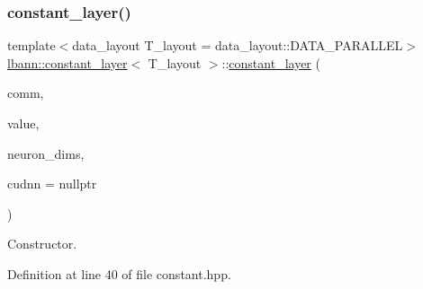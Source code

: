 \subsubsection{\texorpdfstring{constant\+\_\+layer()}{constant\_layer()}}
{\footnotesize\ttfamily template$<$data\+\_\+layout T\+\_\+layout = data\+\_\+layout\+::\+D\+A\+T\+A\+\_\+\+P\+A\+R\+A\+L\+L\+EL$>$ \\
\hyperlink{classlbann_1_1constant__layer}{lbann\+::constant\+\_\+layer}$<$ T\+\_\+layout $>$\+::\hyperlink{classlbann_1_1constant__layer}{constant\+\_\+layer} (\begin{DoxyParamCaption}\item[{\hyperlink{classlbann_1_1lbann__comm}{lbann\+\_\+comm} $\ast$}]{comm,  }\item[{Data\+Type}]{value,  }\item[{const std\+::vector$<$ int $>$ \&}]{neuron\+\_\+dims,  }\item[{\hyperlink{classlbann_1_1cudnn_1_1cudnn__manager}{cudnn\+::cudnn\+\_\+manager} $\ast$}]{cudnn = {\ttfamily nullptr} }\end{DoxyParamCaption})\hspace{0.3cm}{\ttfamily [inline]}}

Constructor. 

Definition at line 40 of file constant.\+hpp.


